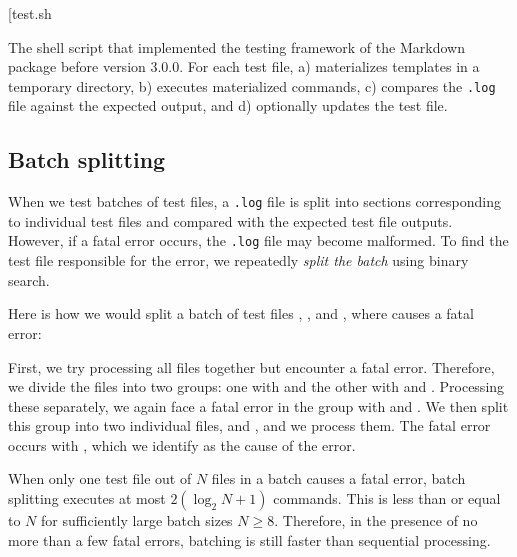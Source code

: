 \documentclass[final]{ltugboat}
\makeatletter
\newenvironment{listing*}{\@dblfloat{listing}}{\end@dblfloat}
\newcounter{listing}
\makeatother
\begin{document}
\begin{listing*}
\bigExample*[{test.sh}
\caption{The shell script  that implemented the testing framework of the Markdown package before version 3.0.0. For each test file,  a) materializes templates in a temporary directory, b) executes materialized commands, c) compares the \texttt{.log} file against the expected output, and d) optionally updates the test file.}
\label{lst:test.sh}
\end{listing*}

\subsection{Batch splitting}

When we test batches of test files, a \texttt{.log} file is split into sections corresponding to individual test files and compared with the expected test file outputs. However, if a fatal error occurs, the \texttt{.log} file may become malformed. To find the test file responsible for the error, we repeatedly \emph{split the batch} using binary search.

Here is how we would split a batch of test files , , and , where  causes a fatal error:

\medskip
\noindent
\begingroup
\centering

\par
\endgroup

\medskip
\noindent
First, we try processing all files together but encounter a fatal error. Therefore, we divide the files into two groups: one with  and the other with  and . Processing these separately, we again face a fatal error in the group with  and . We then split this group into two individual files,  and , and we process them. The fatal error occurs with , which we identify as the cause of the error.

When only one test file out of $N$ files in a batch causes a fatal error, batch splitting executes at most $2 (\log_2 N + 1)$ commands. This is less than or equal to $N$ for sufficiently large batch sizes $N\geq 8$. Therefore, in the presence of no more than a few fatal errors, batching is still faster than sequential processing.

\smallskip
\noindent
\begingroup
\centering

\par
\endgroup
\end{document}

